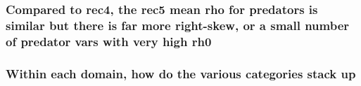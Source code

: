 \documentclass[
]{article}
\begin{document}
\hypertarget{compared-to-rec4-the-rec5-mean-rho-for-predators-is-similar-but-there-is-far-more-right-skew-or-a-small-number-of-predator-vars-with-very-high-rh0}{%
\subsubsection{Compared to rec4, the rec5 mean rho for predators is
similar but there is far more right-skew, or a small number of predator
vars with very high
rh0}\label{compared-to-rec4-the-rec5-mean-rho-for-predators-is-similar-but-there-is-far-more-right-skew-or-a-small-number-of-predator-vars-with-very-high-rh0}}

\hypertarget{within-each-domain-how-do-the-various-categories-stack-up-1}{%
\subsubsection{Within each domain, how do the various categories stack
up}\label{within-each-domain-how-do-the-various-categories-stack-up-1}}
\end{document}

